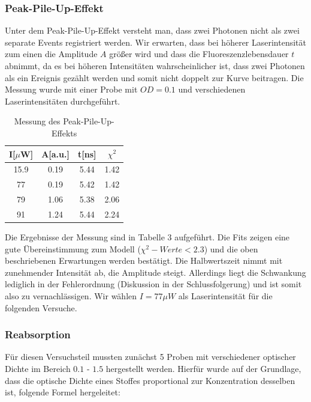\documentclass{article}
\begin{document}
\subsubsection{Peak-Pile-Up-Effekt}
Unter dem Peak-Pile-Up-Effekt versteht man, dass zwei Photonen nicht als zwei separate Events registriert werden. Wir erwarten,
dass bei höherer Laserintensität zum einen die Amplitude $A$ größer wird und dass die Fluoreszenzlebensdauer $t$ abnimmt, da es bei
höheren Intensitäten wahrscheinlicher ist, dass zwei Photonen als ein Ereignis gezählt werden und somit nicht doppelt zur Kurve beitragen.
Die Messung wurde mit einer Probe mit $OD = 0.1$ und verschiedenen Laserintensitäten durchgeführt.

\begin{table}[h]
  \centering
  \begin{tabular}{c|c|c|c}
    I[$\mu$W]      & A[a.u.]  & t[ns]             & $\chi^2$\\
    \hline
    15.9            &  0.19    & 5.44              & 1.42    \\
    77              &  0.19    & 5.42              & 1.42    \\
    79              &  1.06    & 5.38              & 2.06    \\
    91              &  1.24    & 5.44              & 2.24    \\
  \end{tabular}
  \caption{Messung des Peak-Pile-Up-Effekts}
\end{table}


Die Ergebnisse der Messung sind in Tabelle 3 aufgeführt. Die Fits zeigen eine gute Übereinstimmung zum Modell ($\chi^2-Werte < 2.3$)
und die oben beschriebenen Erwartungen werden bestätigt. Die Halbwertszeit nimmt mit zunehmender Intensität ab, die Amplitude steigt.
Allerdings liegt die Schwankung lediglich in der Fehlerordnung (Diskussion in der Schlussfolgerung) und ist somit also zu vernachlässigen. Wir wählen $I = 77 \mu W$ als
Laserintensität für die folgenden Versuche.



\subsubsection{Reabsorption}
Für diesen Versuchsteil mussten zunächst 5 Proben mit verschiedener optischer Dichte im Bereich
$0.1$ - $1.5$ hergestellt werden. Hierfür wurde auf der Grundlage, dass die optische Dichte eines Stoffes
proportional zur Konzentration desselben ist, folgende Formel hergeleitet:
\end{document}
